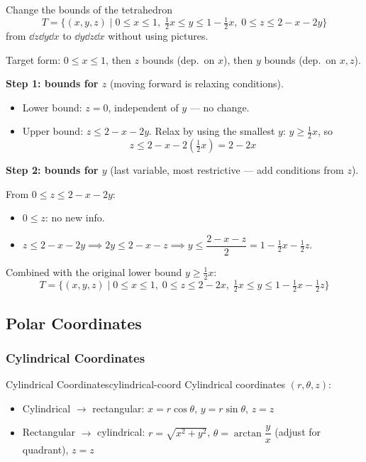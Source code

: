 \begin{example}
  Change the bounds of the tetrahedron
  \[
    T = \{(x,y,z) \mid 0\leq x\leq 1,\; \tfrac{1}{2}x\leq y\leq 1-\tfrac{1}{2}x,\; 0\leq z\leq 2-x-2y\}
  \]
  from $\dd{z}\dd{y}\dd{x}$ to $\dd{y}\dd{z}\dd{x}$ without using pictures.

  Target form: $0\leq x\leq 1$, then $z$ bounds (dep.\ on $x$), then $y$ bounds (dep.\ on $x,z$).

  \textbf{Step 1: bounds for $z$} (moving forward is relaxing conditions).
  \begin{itemize}
    \item Lower bound: $z = 0$, independent of $y$ --- no change.
    \item Upper bound: $z \leq 2 - x - 2y$. Relax by using the smallest $y$: $y \geq \tfrac{1}{2}x$, so
          \[
            z \leq 2 - x - 2\!\left(\tfrac{1}{2}x\right) = 2 - 2x
          \]
  \end{itemize}

  \textbf{Step 2: bounds for $y$} (last variable, most restrictive --- add conditions from $z$).

  From $0\leq z\leq 2-x-2y$:
  \begin{itemize}
    \item $0\leq z$: no new info.
    \item $z\leq 2-x-2y \implies 2y\leq 2-x-z \implies y\leq \dfrac{2-x-z}{2} = 1 - \tfrac{1}{2}x - \tfrac{1}{2}z$.
  \end{itemize}

  Combined with the original lower bound $y\geq\tfrac{1}{2}x$:
  \[
    T = \{(x,y,z) \mid 0\leq x\leq 1,\; 0\leq z\leq 2-2x,\; \tfrac{1}{2}x\leq y\leq 1 - \tfrac{1}{2}x - \tfrac{1}{2}z\}
  \]
\end{example}

\subsection{Polar Coordinates}

\subsubsection{Cylindrical Coordinates}

\begin{definition}{Cylindrical Coordinates}{cylindrical-coord}
  Cylindrical coordinates $(r,\theta,z)$:
  \begin{itemize}
    \item Cylindrical $\to$ rectangular: $x = r\cos\theta$, \; $y = r\sin\theta$, \; $z = z$
    \item Rectangular $\to$ cylindrical: $r = \sqrt{x^2+y^2}$, \; $\theta = \arctan\!\dfrac{y}{x}$ (adjust for quadrant), \; $z = z$
  \end{itemize}
\end{definition}


